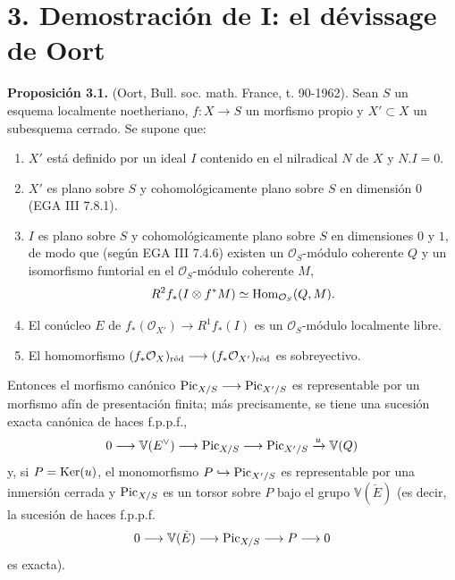 
\providecommand{\sisi}[2]{#2}

\section*{3. Demostración de I: el dévissage de Oort}

\textbf{Proposición 3.1.} (Oort, Bull. soc. math. France, t. 90-1962).
Sean $S$ un esquema localmente noetheriano, $f:X\to S$ un morfismo propio y
$X'\subset X$ un subesquema cerrado. Se supone que:
\begin{enumerate}[label=\roman*)]
\item $X'$ está definido por un ideal $I$ contenido en el nilradical $N$ de
$X$ y $N.I=0$.
\item $X'$ es plano sobre $S$ y cohomológicamente plano sobre $S$ en
dimensión $0$ (EGA III 7.8.1).
\item $I$ es plano sobre $S$ y cohomológicamente plano sobre $S$ en
dimensiones $0$ y $1$, de modo que (según EGA III 7.4.6) existen un
$\mathcal O_S$-módulo coherente $Q$ y un isomorfismo funtorial en el
$\mathcal O_S$-módulo coherente $M$,
\[
R^2f_*(I\otimes f^*M)\simeq \Hom_{\mathcal O_S}(Q,M).
\]
\item El conúcleo $E$ de $f_*(\mathcal O_{X'})\to R^1f_*(I)$ es un
$\mathcal O_S$-módulo localmente libre.
\item El homomorfismo
$(f_*\mathcal O_X)_{\red}\longrightarrow(f_*\mathcal O_{X'})_{\red}$ es
sobreyectivo.
\end{enumerate}
Entonces el morfismo canónico
$\Pic_{X/S}\longrightarrow\Pic_{X'/S}$ es representable por un morfismo
afín de presentación finita; más precisamente, se tiene una sucesión exacta
canónica de haces f.p.p.f.,
\[
0\longrightarrow \mathbb V(E^\vee)\longrightarrow \Pic_{X/S}
\longrightarrow\Pic_{X'/S}\xrightarrow{u}\mathbb V(Q)
\]
y, si $P=\Ker(u)$, el monomorfismo $P\hookrightarrow\Pic_{X'/S}$ es
representable por una inmersión cerrada y $\Pic_{X/S}$ es un torsor sobre
$P$ bajo el grupo $\mathbb V(\check E)$ (es decir, la sucesión de haces
f.p.p.f.
\[
0\longrightarrow \mathbb V(\check E)\longrightarrow \Pic_{X/S}
\longrightarrow P\longrightarrow0
\]
es exacta).

